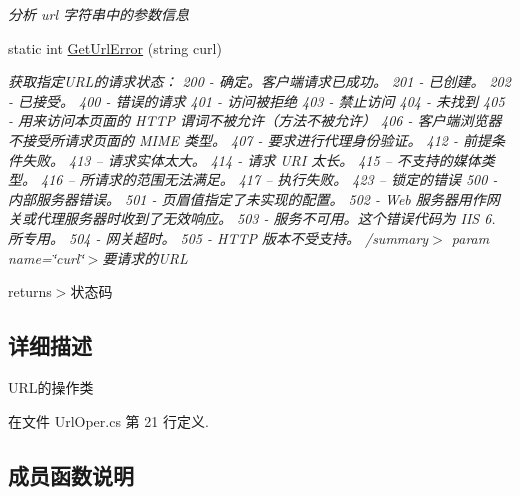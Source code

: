 \begin{DoxyCompactItemize}
\begin{DoxyCompactList}\small\item\em 分析 url 字符串中的参数信息 \end{DoxyCompactList}\item 
static int \hyperlink{class_x_c_l_net_tools_1_1_string_hander_1_1_url_oper_ac5c640bfc662741345164efa1efbc525}{Get\+Url\+Error} (string curl)
\begin{DoxyCompactList}\small\item\em 获取指定\+U\+R\+L的请求状态： 200 -\/ 确定。客户端请求已成功。 201 -\/ 已创建。 202 -\/ 已接受。 400 -\/ 错误的请求 401 -\/ 访问被拒绝 403 -\/ 禁止访问 404 -\/ 未找到 405 -\/ 用来访问本页面的 H\+T\+TP 谓词不被允许（方法不被允许） 406 -\/ 客户端浏览器不接受所请求页面的 M\+I\+ME 类型。 407 -\/ 要求进行代理身份验证。 412 -\/ 前提条件失败。 413 – 请求实体太大。 414 -\/ 请求 U\+RI 太长。 415 – 不支持的媒体类型。 416 – 所请求的范围无法满足。 417 – 执行失败。 423 – 锁定的错误 500 -\/ 内部服务器错误。 501 -\/ 页眉值指定了未实现的配置。 502 -\/ Web 服务器用作网关或代理服务器时收到了无效响应。 503 -\/ 服务不可用。这个错误代码为 I\+IS 6. 所专用。 504 -\/ 网关超时。 505 -\/ H\+T\+TP 版本不受支持。 /summary$>$ param name=\char`\"{}curl\char`\"{}$>$要请求的\+U\+RL

returns$>$状态码\end{DoxyCompactList}\end{DoxyCompactItemize}


\subsection{详细描述}
U\+R\+L的操作类 



在文件 Url\+Oper.\+cs 第 21 行定义.



\subsection{成员函数说明}
\mbox{\label{class_x_c_l_net_tools_1_1_string_hander_1_1_url_oper_a63e4554d226a4e22cdf68614d6fdd1c1}} 

